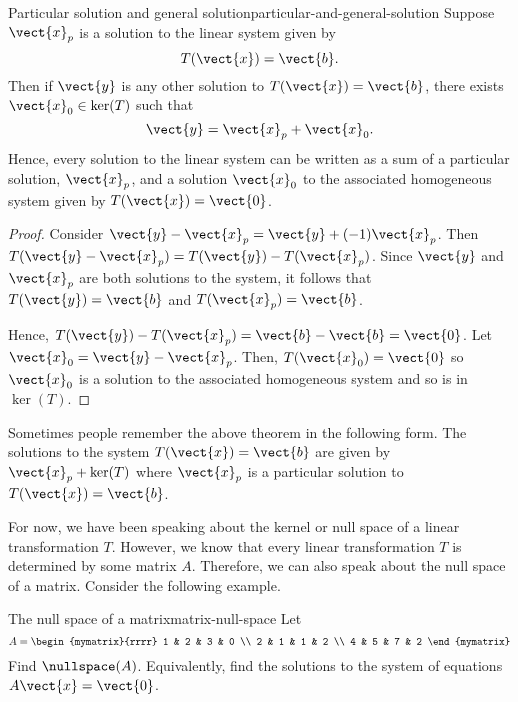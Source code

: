 \begin{theorem}{Particular solution and general solution}{particular-and-general-solution}
Suppose $\vect{x}_{p}$ is a solution to the linear system given by
\begin{equation*}
T(\vect{x}) = \vect{b}.
\end{equation*}
Then if $\vect{y}$ is any other solution to $T(\vect{x})=\vect{b}$, 
 there exists $\vect{x}_0 \in \ker
(T) $ such that
\begin{equation*}
\vect{y} = \vect{x}_{p}+ \vect{x}_0.
\end{equation*}
Hence, every solution to the linear system can be written as a sum of a particular solution, $\vect{x}_p$,
 and a solution $\vect{x}_0$ to the associated 
homogeneous system given by $T(\vect{x})=\vect{0}$.
\end{theorem}

\begin{proof}
Consider $\vect{y} - \vect{x}_{p}= \vect{y} + (
-1) \vect{x}_{p}$. Then $T(\vect{y} - \vect{x}_{p}) =T(\vect{y})
-T(\vect{x}_{p})$. Since $\vect{y}$ and $\vect{x}_{p}$ are both solutions to the system, it follows that $T(\vect{y})= \vect{b} $
and $T(\vect{x}_p) = \vect{b}$. 

Hence, $T(\vect{y})-T(\vect{x}_{p})
=\vect{b} - \vect{b} = \vect{0}$.  Let $\vect{x}_0 = \vect{y} - \vect{x}_{p}$.
Then, $T(\vect{x}_0)= \vect{0} $ so $\vect{x}_0$ is a solution to the associated homogeneous system and so is in $\ker (T)$.
\end{proof}

Sometimes people remember the above theorem in the following form. The
solutions to the system $T(\vect{x})=\vect{b}$ are given by 
$\vect{x}_{p}+\ker (T) $ where $\vect{x}_{p}$ is a particular
solution to $T(\vect{x})=\vect{b}$.

For now, we have been speaking about the kernel or null space of a linear transformation $T$. However, 
we know that every linear transformation $T$ is determined by some matrix $A$. Therefore,
we can also speak about the null space of a matrix. Consider the following example.  

\begin{example}{The null space of a matrix}{matrix-null-space}
Let
\begin{equation*}
A=\begin{mymatrix}{rrrr}
1 & 2 & 3 & 0 \\
2 & 1 & 1 & 2 \\
4 & 5 & 7 & 2
\end{mymatrix}
\end{equation*}
Find $\nullspace(A)$. Equivalently, find the solutions to the
system of equations $A\vect{x}=\vect{0}$.
\end{example}

